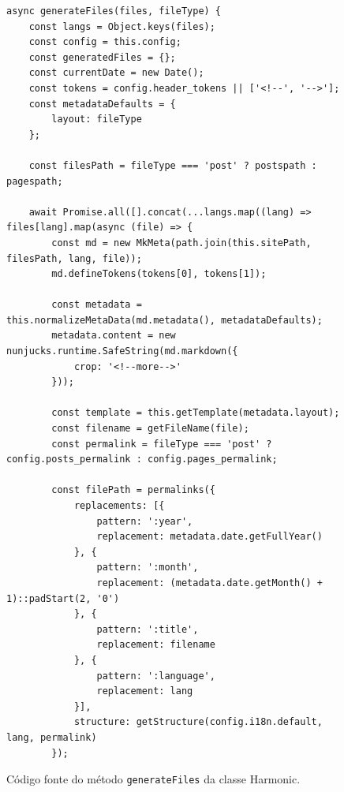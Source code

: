 \documentclass[ppginf, pep]{esinucpel}
\newcommand{\code}[1]{\texttt{#1}}
\begin{document}
\begin{figure}[htbp]
    \centering
    \caption{Código fonte do método \code{generateFiles} da classe Harmonic.}
    \vspace{5pt}
    \lstset{language=JavaScript}
    \begin{lstlisting}
async generateFiles(files, fileType) {
    const langs = Object.keys(files);
    const config = this.config;
    const generatedFiles = {};
    const currentDate = new Date();
    const tokens = config.header_tokens || ['<!--', '-->'];
    const metadataDefaults = {
        layout: fileType
    };

    const filesPath = fileType === 'post' ? postspath : pagespath;

    await Promise.all([].concat(...langs.map((lang) => files[lang].map(async (file) => {
        const md = new MkMeta(path.join(this.sitePath, filesPath, lang, file));
        md.defineTokens(tokens[0], tokens[1]);

        const metadata = this.normalizeMetaData(md.metadata(), metadataDefaults);
        metadata.content = new nunjucks.runtime.SafeString(md.markdown({
            crop: '<!--more-->'
        }));

        const template = this.getTemplate(metadata.layout);
        const filename = getFileName(file);
        const permalink = fileType === 'post' ? config.posts_permalink : config.pages_permalink;

        const filePath = permalinks({
            replacements: [{
                pattern: ':year',
                replacement: metadata.date.getFullYear()
            }, {
                pattern: ':month',
                replacement: (metadata.date.getMonth() + 1)::padStart(2, '0')
            }, {
                pattern: ':title',
                replacement: filename
            }, {
                pattern: ':language',
                replacement: lang
            }],
            structure: getStructure(config.i18n.default, lang, permalink)
        });
    \end{lstlisting}
    \label{fig:code_generateFiles}
\end{figure}
\end{document}
